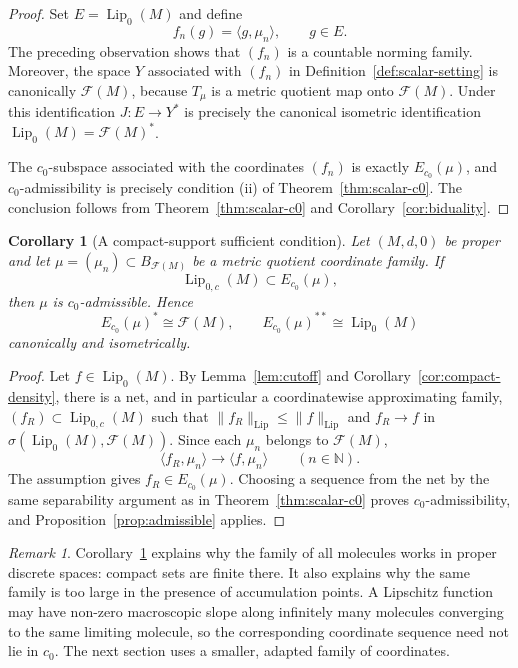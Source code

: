 \documentclass[11pt]{amsart}
\theoremstyle{plain}
\newtheorem{corollary}[theorem]{Corollary}
\theoremstyle{definition}
\theoremstyle{remark}
\newtheorem{remark}[theorem]{Remark}
\newcommand{\Lip}{\operatorname{Lip}}
\newcommand{\F}{\mathcal F}
\newcommand{\N}{\mathbb N}
\begin{document}
\begin{proof}
Set $E=\Lip_0(M)$ and define
\[
        f_n(g)=\langle g,\mu_n\rangle,
        \qquad g\in E.
\]
The preceding observation shows that $(f_n)$ is a countable norming family.
Moreover, the space $Y$ associated with $(f_n)$ in
Definition~\ref{def:scalar-setting} is canonically $\F(M)$, because
$T_\mu$ is a metric quotient map onto $\F(M)$. Under this identification
$J:E\to Y^*$ is precisely the canonical isometric identification
$\Lip_0(M)=\F(M)^*$.

The $c_0$-subspace associated with the coordinates $(f_n)$ is exactly
$E_{c_0}(\mu)$, and $c_0$-admissibility is precisely condition \textup{(ii)}
of Theorem~\ref{thm:scalar-c0}. The conclusion follows from
Theorem~\ref{thm:scalar-c0} and Corollary~\ref{cor:biduality}.
\end{proof}

\begin{corollary}[A compact-support sufficient condition]
\label{cor:compact-admissible}
Let $(M,d,0)$ be proper and let $\mu=(\mu_n)\subset B_{\F(M)}$ be a metric
quotient coordinate family. If
\[
        \Lip_{0,c}(M)\subset E_{c_0}(\mu),
\]
then $\mu$ is $c_0$-admissible. Hence
\[
        E_{c_0}(\mu)^*\cong \F(M),
        \qquad
        E_{c_0}(\mu)^{**}\cong \Lip_0(M)
\]
canonically and isometrically.
\end{corollary}

\begin{proof}
Let $f\in\Lip_0(M)$. By Lemma~\ref{lem:cutoff} and
Corollary~\ref{cor:compact-density}, there is a net, and in particular a
coordinatewise approximating family, $(f_R)\subset\Lip_{0,c}(M)$ such that
$\|f_R\|_{\Lip}\le\|f\|_{\Lip}$ and
$f_R\to f$ in $\sigma(\Lip_0(M),\F(M))$. Since each $\mu_n$ belongs to
$\F(M)$,
\[
        \langle f_R,\mu_n\rangle\to\langle f,
        \mu_n\rangle
        \qquad(n\in\N).
\]
The assumption gives $f_R\in E_{c_0}(\mu)$. Choosing a sequence from the
net by the same separability argument as in Theorem~\ref{thm:scalar-c0}
proves $c_0$-admissibility, and Proposition~\ref{prop:admissible} applies.
\end{proof}

\begin{remark}
Corollary~\ref{cor:compact-admissible} explains why the family of all
molecules works in proper discrete spaces: compact sets are finite there.
It also explains why the same family is too large in the presence of
accumulation points. A Lipschitz function may have non-zero macroscopic
slope along infinitely many molecules converging to the same limiting
molecule, so the corresponding coordinate sequence need not lie in $c_0$.
The next section uses a smaller, adapted family of coordinates.
\end{remark}
\end{document}
